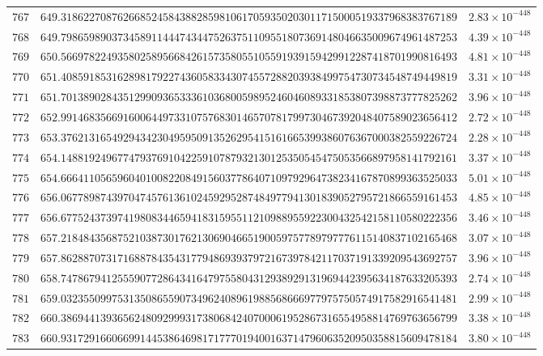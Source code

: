 \documentclass[12pt,reqno]{amsart}
\theoremstyle{remark}
\begin{document}
\begin{longtable}{clc}
$767$ & $649.3186227087626685245843882859810617059350203011715000519337968383767189$ & $2.83\times 10^{-448}$ \\
$768$ & $649.7986598903734589114447434475263751109551807369148046635009674961487253$ & $4.39\times 10^{-448}$ \\
$769$ & $650.5669782249358025895668426157358055105591939159429912287418701990816493$ & $4.81\times 10^{-448}$ \\
$770$ & $651.4085918531628981792274360583343074557288203938499754730734548749449819$ & $3.31\times 10^{-448}$ \\
$771$ & $651.7013890284351299093653336103680059895246046089331853807398873777825262$ & $3.96\times 10^{-448}$ \\
$772$ & $652.9914683566916006449733107576830146570781799730467392048407589023656412$ & $2.72\times 10^{-448}$ \\
$773$ & $653.3762131654929434230495950913526295415161665399386076367000382559226724$ & $2.28\times 10^{-448}$ \\
$774$ & $654.1488192496774793769104225910787932130125350545475053566897958141792161$ & $3.37\times 10^{-448}$ \\
$775$ & $654.6664110565960401008220849156037786407109792964738234167870899363525033$ & $5.01\times 10^{-448}$ \\
$776$ & $656.0677898743970474576136102459295287484977941301839052795721866559161453$ & $4.85\times 10^{-448}$ \\
$777$ & $656.6775243739741980834465941831595511210988955922300432542158110580222356$ & $3.46\times 10^{-448}$ \\
$778$ & $657.2184843568752103873017621306904665190059757789797776115140837102165468$ & $3.07\times 10^{-448}$ \\
$779$ & $657.8628870731716887843543177948693937972167397842117037191339209543692757$ & $3.96\times 10^{-448}$ \\
$780$ & $658.7478679412555907728643416479755804312938929131969442395634187633205393$ & $2.74\times 10^{-448}$ \\
$781$ & $659.0323550997531350865590734962408961988568666977975750574917582916541481$ & $2.99\times 10^{-448}$ \\
$782$ & $660.3869441393656248092999317380684240700061952867316554958814769763656799$ & $3.38\times 10^{-448}$ \\
$783$ & $660.9317291660669914453864698171777019400163714796063520950358815609478184$ & $3.80\times 10^{-448}$ \\

\end{longtable}
\end{document}
